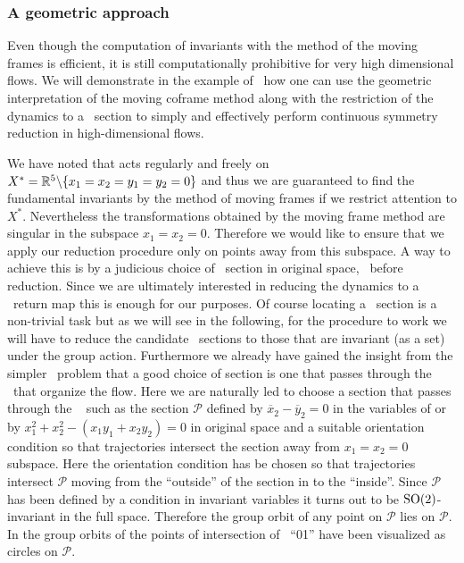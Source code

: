 \subsubsection{A geometric approach}
\label{laserMFnum}

Even though the computation of invariants with the method of the moving frames is efficient,
it is still computationally prohibitive for very high dimensional flows. We will demonstrate
in the example of \CLe\ how one can use the geometric interpretation of the moving coframe method
along with the restriction of the dynamics to a \Poincare\ section to simply and effectively
perform continuous symmetry reduction in high-dimensional flows.

We have noted that  acts regularly and freely on $X^*=\mathbb{R}^{5}\backslash\{x_1=x_2=y_1=y_2=0\}$ and
thus we are guaranteed to find the fundamental invariants by the method of moving frames
if we restrict attention to $X^*$. Nevertheless the transformations 
obtained by the moving frame method are singular in the subspace $x_1=x_2=0$. Therefore
we would like to ensure that we apply our reduction procedure only on points away from this
subspace. A way to achieve this is by a judicious choice of \Poincare\ section in original space,
\ie~before reduction. Since we are ultimately interested in reducing the dynamics to a \Poincare\
return map this is enough for our purposes. Of course locating a \Poincare\ section is a non-trivial
task but as we will see in the following, for the procedure to work we will
have to reduce the candidate \Poincare\ sections to those that are invariant (as a set) under
the group action. Furthermore we already have gained the insight from the simpler \Le\ problem
that a good choice of section is one that passes through the \eqva\ that organize the flow.
Here we are naturally led to choose a section that passes through the \reqv~\REQB{1} such as the
section $\mathcal{P}$ defined by $\overline{x}_2-\overline{y}_2=0$ in the variables of
\refeq{eq:invLaser} or by $x_1^2+x_2^2-(x_1 y_1 + x_2 y_2)=0$ in original space and
a suitable orientation condition so that trajectories intersect the section away from
$x_1=x_2=0$ subspace. Here the orientation condition has be chosen so that trajectories intersect
$\mathcal{P}$ moving from the ``outside'' of the section in \reffig{fig:CLEmartini} to the
``inside''.
Since $\mathcal{P}$ has been defined by a condition in invariant variables 
it turns out to be $\mathrm{SO}(2)$-invariant in the full space. Therefore the group orbit of any point on
$\mathcal{P}$ lies on $\mathcal{P}$. In \reffig{fig:CLEmartini} the group orbits of the points
of intersection of \rpo~``01'' have been visualized as circles on $\mathcal{P}$.


